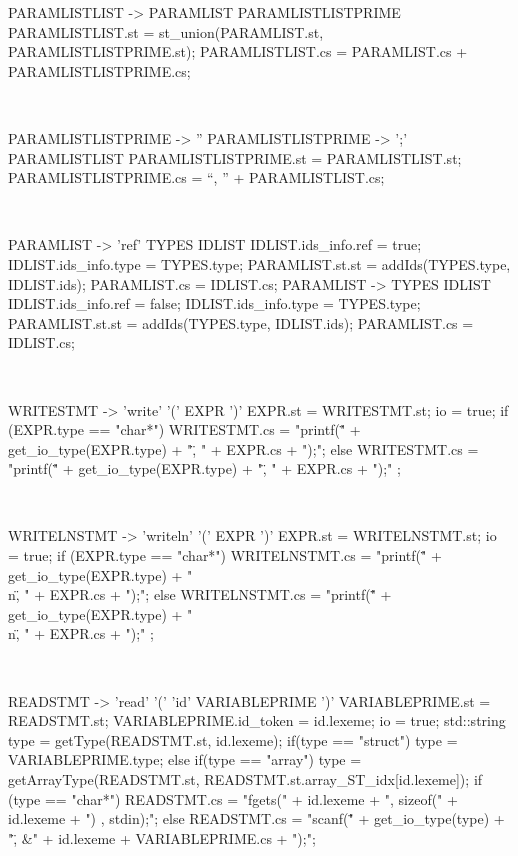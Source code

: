 \begin{verbbox}[\scriptsize]
PARAMLISTLIST -> PARAMLIST PARAMLISTLISTPRIME
{
PARAMLISTLIST.st = st_union(PARAMLIST.st, PARAMLISTLISTPRIME.st);
PARAMLISTLIST.cs = PARAMLIST.cs + PARAMLISTLISTPRIME.cs;
}
\end{verbbox} 
\theverbbox\\

\begin{verbbox}[\scriptsize]
PARAMLISTLISTPRIME -> '' {}
PARAMLISTLISTPRIME -> ';' PARAMLISTLIST
{
PARAMLISTLISTPRIME.st = PARAMLISTLIST.st;
PARAMLISTLISTPRIME.cs = “, ” + PARAMLISTLIST.cs;
}
\end{verbbox} 
\theverbbox\\

\begin{verbbox}[\scriptsize]
PARAMLIST -> 'ref' TYPES IDLIST
{
IDLIST.ids_info.ref = true;
IDLIST.ids_info.type = TYPES.type;
PARAMLIST.st.st = addIds(TYPES.type, IDLIST.ids);
PARAMLIST.cs = IDLIST.cs;
}
PARAMLIST -> TYPES IDLIST
{
IDLIST.ids_info.ref = false;
IDLIST.ids_info.type = TYPES.type;
PARAMLIST.st.st = addIds(TYPES.type, IDLIST.ids);
PARAMLIST.cs = IDLIST.cs;
}
\end{verbbox} 
\theverbbox\\

\begin{verbbox}[\scriptsize]
WRITESTMT -> 'write' '(' EXPR ')'
{
EXPR.st = WRITESTMT.st;
io = true;
if (EXPR.type == "char*") {
    WRITESTMT.cs = "printf(\"" + get_io_type(EXPR.type) + "\", " + EXPR.cs + ");\n";
} else {
    WRITESTMT.cs = "printf(\"" + get_io_type(EXPR.type) + "\", " + EXPR.cs + ");\n" ;
}
}
\end{verbbox} 
\theverbbox\\

\begin{verbbox}[\scriptsize]
WRITELNSTMT -> 'writeln' '(' EXPR ')'
{
EXPR.st = WRITELNSTMT.st;
io = true;
if (EXPR.type == "char*") {
    WRITELNSTMT.cs = "printf(\"" + get_io_type(EXPR.type) + "\\n\", " + EXPR.cs + ");\n";
} else {
    WRITELNSTMT.cs = "printf(\"" + get_io_type(EXPR.type) + "\\n\", " + EXPR.cs + ");\n" ;
}
}
\end{verbbox} 
\theverbbox\\

\begin{verbbox}[\scriptsize]
READSTMT -> 'read' '(' 'id' VARIABLEPRIME ')'
{
VARIABLEPRIME.st = READSTMT.st;
VARIABLEPRIME.id_token = id.lexeme;
io = true;
std::string type = getType(READSTMT.st, id.lexeme);
if(type == "struct") {
    type = VARIABLEPRIME.type;
} else if(type == "array") {
    type = getArrayType(READSTMT.st, READSTMT.st.array_ST_idx[id.lexeme]);
}
if (type == "char*") {
    READSTMT.cs = "fgets(" + id.lexeme + ", sizeof(" + id.lexeme + ") , stdin);\n";
} else {
    READSTMT.cs = "scanf(\"" + get_io_type(type) + "\", &" + id.lexeme + VARIABLEPRIME.cs + ");\n";
}
}
\end{verbbox} 
\theverbbox\\

